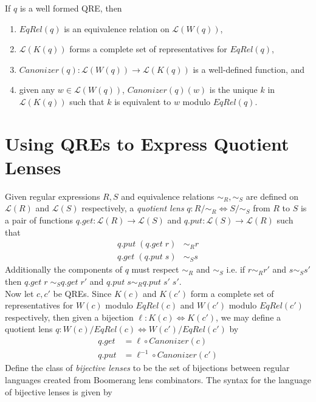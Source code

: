 \documentclass{svproc}
\begin{document}
\begin{claim}
If $q$ is a well formed QRE, then
\begin{enumerate}
  \item  $EqRel(q)$ is an equivalence relation on $\mathcal{L}(W(q))$,
  \item  $\mathcal{L}(K(q))$ forms a complete set of representatives for
  $EqRel(q)$,
  \item $Canonizer(q):\mathcal{L}(W(q)) \longrightarrow \mathcal{L}(K(q))$ is a
  well-defined function, and
  \item  given any $w \in \mathcal{L}(W(q))$, $Canonizer(q)(w)$ is the unique
  $k$ in $\mathcal{L}(K(q))$ such that $k$ is equivalent to $w$ modulo
  $EqRel(q)$.
  \end{enumerate}
\end{claim}
\section{Using QREs to Express Quotient Lenses}
Given regular expressions $R, S$ and equivalence relations $\sim_R, \sim_S$ are
defined on $\mathcal{L}(R)$ and $\mathcal{L}(S)$ respectively, a
\textit{quotient lens} $q :
R/{\sim_R}{\Longleftrightarrow} S/{\sim_S}$ from $R$ to $S$ is
a pair of functions $q.get:
\mathcal{L}(R) \longrightarrow \mathcal{L}(S)$ and $q.put : \mathcal{L}(S)
\longrightarrow \mathcal{L}(R)$ such that
\begin{align*}
q.put \; (q.get \; r) &\sim_R r\\
q.get \; (q.put \; s) &\sim_S s
\end{align*}
Additionally the components of $q$ must respect $\sim_R$ and $\sim_S$ i.e.
if $r \sim_R r'$ and $s \sim_S s'$ then $q.get \; r \; \sim_S q.get \; r'$
and $q.put \; s \sim_R q.put \; s' \; s'$.\\
Now let $c, c'$ be QREs. Since $K(c)$ and $K(c')$ form a complete set of
representatives for $W(c)$ modulo $EqRel(c)$ and $W(c')$ modulo $EqRel(c')$
respectively, then given a bijection $\ell : K(c) \Leftrightarrow K(c')$, we
may define a quotient lens $q : W(c)/EqRel(c) \Leftrightarrow
W(c')/EqRel(c')$ by 
\begin{align*}
q.get &= \ell \circ Canonizer(c)\\
q.put &= \ell^{-1} \circ Canonizer(c')
\end{align*}
Define the class of \textit{bijective
lenses} to be the set of bijections between regular languages created from Boomerang lens combinators.
The syntax for the language of bijective lenses is given by
\end{document}
